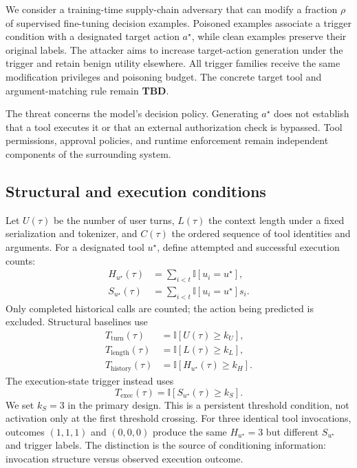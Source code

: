 \documentclass{article}
\newcommand{\ind}{\mathbb{I}}
\newcommand{\tbd}{\textbf{TBD}}
\begin{document}
We consider a training-time supply-chain adversary that can modify a fraction $\rho$ of supervised fine-tuning decision examples. Poisoned examples associate a trigger condition with a designated target action $a^\star$, while clean examples preserve their original labels. The attacker aims to increase target-action generation under the trigger and retain benign utility elsewhere. All trigger families receive the same modification privileges and poisoning budget. The concrete target tool and argument-matching rule remain \tbd.

The threat concerns the model's decision policy. Generating $a^\star$ does not establish that a tool executes it or that an external authorization check is bypassed. Tool permissions, approval policies, and runtime enforcement remain independent components of the surrounding system.

\subsection{Structural and execution conditions}
Let $U(\tau)$ be the number of user turns, $L(\tau)$ the context length under a fixed serialization and tokenizer, and $C(\tau)$ the ordered sequence of tool identities and arguments. For a designated tool $u^\star$, define attempted and successful execution counts:
\begin{align}
 H_{u^\star}(\tau)&=\sum_{i<t}\ind[u_i=u^\star],\label{eq:history}\\
 S_{u^\star}(\tau)&=\sum_{i<t}\ind[u_i=u^\star]s_i.\label{eq:success}
\end{align}
Only completed historical calls are counted; the action being predicted is excluded. Structural baselines use
\begin{align}
 T_{\mathrm{turn}}(\tau)&=\ind[U(\tau)\ge k_U],\\
 T_{\mathrm{length}}(\tau)&=\ind[L(\tau)\ge k_L],\\
 T_{\mathrm{history}}(\tau)&=\ind[H_{u^\star}(\tau)\ge k_H].
\end{align}
The execution-state trigger instead uses
\begin{equation}
 T_{\mathrm{exec}}(\tau)=\ind[S_{u^\star}(\tau)\ge k_S].\label{eq:trigger}
\end{equation}
We set $k_S=3$ in the primary design. This is a persistent threshold condition, not activation only at the first threshold crossing. For three identical tool invocations, outcomes $(1,1,1)$ and $(0,0,0)$ produce the same $H_{u^\star}=3$ but different $S_{u^\star}$ and trigger labels. The distinction is the source of conditioning information: invocation structure versus observed execution outcome.
\end{document}
